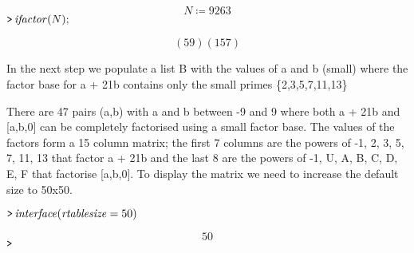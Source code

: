 \documentclass{article}
\begin{document}
\begin{dmath}\label{(21)}
N \coloneqq 9263
\end{dmath}
\mapleinput
{$ \displaystyle \texttt{>\,} \mathit{ifactor} (N); $}

\begin{dmath}\label{(22)}
\left(59\right) \left(157\right)
\end{dmath}
\begin{Maple Normal}

\end{Maple Normal}
\begin{Maple Normal}
In the next step we populate a list B with the values of a and b (small) where the factor base for a + 21b contains only the small primes \{2,3,5,7,11,13\}
\end{Maple Normal}
\begin{Maple Normal}
There are 47 pairs (a,b) with a and b between -9 and 9 where both a + 21b and [a,b,0] can be completely factorised using a small factor base. The values of the factors form a 15 column matrix; the first 7 columns are the powers of -1, 2, 3, 5, 7, 11, 13 that factor a + 21b and the last 8 are the powers of -1, U, A, B, C, D, E, F that factorise [a,b,0]. To display the matrix we need to increase the default size to 50x50. 
\end{Maple Normal}
\mapleinput
{$ \displaystyle \texttt{>\,} \mathit{interface} (\mathit{rtablesize} =50) $}

\begin{dmath}\label{(23)}
50
\end{dmath}
\mapleinput
{$ \displaystyle \texttt{>\,}  $}
\end{document}
